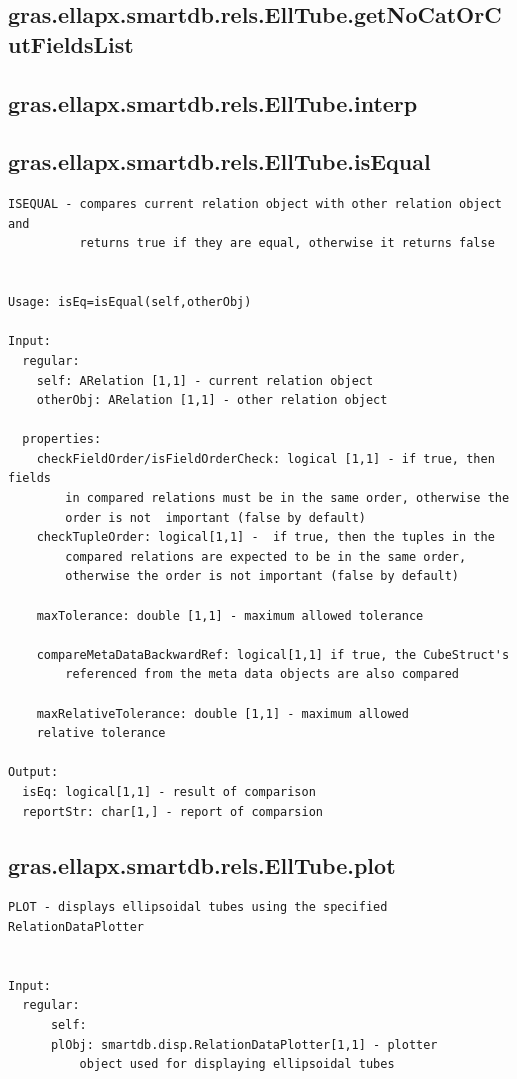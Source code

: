 \documentclass[letterpaper,10pt,english]{sphinxmanual}
\begin{document}
\subsection{gras.ellapx.smartdb.rels.EllTube.getNoCatOrCutFieldsList}
\label{chap_functions:gras-ellapx-smartdb-rels-elltube-getnocatorcutfieldslist}

\subsection{gras.ellapx.smartdb.rels.EllTube.interp}
\label{chap_functions:gras-ellapx-smartdb-rels-elltube-interp}

\subsection{gras.ellapx.smartdb.rels.EllTube.isEqual}
\label{chap_functions:gras-ellapx-smartdb-rels-elltube-isequal}
\begin{Verbatim}[commandchars=\\\{\}]
ISEQUAL - compares current relation object with other relation object and
          returns true if they are equal, otherwise it returns false


Usage: isEq=isEqual(self,otherObj)

Input:
  regular:
    self: ARelation [1,1] - current relation object
    otherObj: ARelation [1,1] - other relation object

  properties:
    checkFieldOrder/isFieldOrderCheck: logical [1,1] - if true, then fields
        in compared relations must be in the same order, otherwise the
        order is not  important (false by default)
    checkTupleOrder: logical[1,1] -  if true, then the tuples in the
        compared relations are expected to be in the same order,
        otherwise the order is not important (false by default)

    maxTolerance: double [1,1] - maximum allowed tolerance

    compareMetaDataBackwardRef: logical[1,1] if true, the CubeStruct's
        referenced from the meta data objects are also compared

    maxRelativeTolerance: double [1,1] - maximum allowed
    relative tolerance

Output:
  isEq: logical[1,1] - result of comparison
  reportStr: char[1,] - report of comparsion
\end{Verbatim}


\subsection{gras.ellapx.smartdb.rels.EllTube.plot}
\label{chap_functions:gras-ellapx-smartdb-rels-elltube-plot}
\begin{Verbatim}[commandchars=\\\{\}]
PLOT - displays ellipsoidal tubes using the specified RelationDataPlotter


Input:
  regular:
      self:
      plObj: smartdb.disp.RelationDataPlotter[1,1] - plotter
          object used for displaying ellipsoidal tubes
\end{Verbatim}
\end{document}
